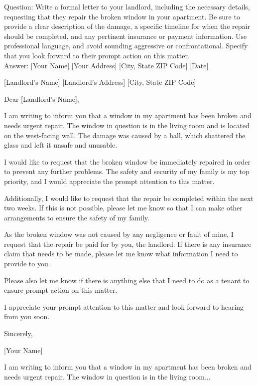 \begin{tcolorbox}[fonttitle = \small\bfseries, title=ICL exemplar \# 3 with highest ``Deep'',colframe=gray!2!black,colback=gray!2!white,boxrule=1pt,boxsep=0pt,left=5pt,right=5pt,fontupper=\footnotesize, halign title = flush center]
Question: Write a formal letter to your landlord, including the necessary details, requesting that they repair the broken window in your apartment. Be sure to provide a clear description of the damage, a specific timeline for when the repair should be completed, and any pertinent insurance or payment information. Use professional language, and avoid sounding aggressive or confrontational. Specify that you look forward to their prompt action on this matter.\\
Answer: [Your Name]
[Your Address]
[City, State ZIP Code]
[Date]

[Landlord's Name]
[Landlord's Address]
[City, State ZIP Code]

Dear [Landlord's Name],

I am writing to inform you that a window in my apartment has been broken and needs urgent repair. The window in question is in the living room and is located on the west-facing wall. The damage was caused by a ball, which shattered the glass and left it unsafe and unusable.

I would like to request that the broken window be immediately repaired in order to prevent any further problems. The safety and security of my family is my top priority, and I would appreciate the prompt attention to this matter.

Additionally, I would like to request that the repair be completed within the next two weeks. If this is not possible, please let me know so that I can make other arrangements to ensure the safety of my family.

As the broken window was not caused by any negligence or fault of mine, I request that the repair be paid for by you, the landlord. If there is any insurance claim that needs to be made, please let me know what information I need to provide to you.

Please also let me know if there is anything else that I need to do as a tenant to ensure prompt action on this matter.

I appreciate your prompt attention to this matter and look forward to hearing from you soon.

Sincerely,

[Your Name]

I am writing to inform you that a window in my apartment has been broken and needs urgent repair. The window in question is in the living room...
\end{tcolorbox}

